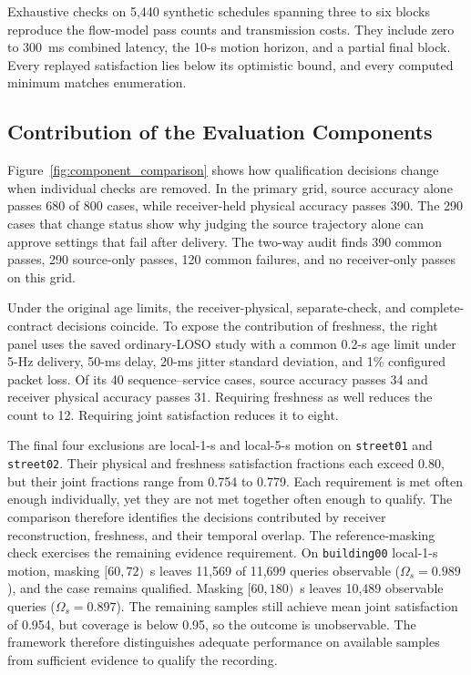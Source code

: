 \documentclass[journal]{IEEEtran}
\newcommand{\rev}[1]{#1}
\newcommand{\revision}[1]{#1}
\begin{document}
\rev{Exhaustive checks on 5,440 synthetic schedules spanning three to six
blocks reproduce the flow-model pass counts and transmission costs.
They include zero to 300~ms combined latency, the 10-s motion horizon,
and a partial final block. Every replayed satisfaction lies below its
optimistic bound, and every computed minimum matches enumeration.}

\subsection{Contribution of the Evaluation Components}
\label{subsec:component_comparison}

Figure~\ref{fig:component_comparison} shows how qualification decisions
change when individual checks are removed. In the primary grid,
source accuracy alone passes
680 of 800 cases, while receiver-held physical accuracy passes 390.
The 290 cases that change status show why judging the source trajectory
alone can approve settings that fail after delivery.
\rev{The two-way audit finds 390 common passes, 290 source-only passes,
120 common failures, and no receiver-only passes on this grid.}

Under the original age limits, the receiver-physical, separate-check, and
complete-contract decisions coincide. To expose the contribution of freshness,
the right panel uses the saved ordinary-LOSO study with a common 0.2-s age
limit under 5-Hz delivery, 50-ms delay, 20-ms jitter standard deviation,
and 1\% configured packet loss. Of its 40 sequence--service cases, source
accuracy passes 34 and receiver physical accuracy passes 31. Requiring
freshness as well reduces the count to 12. Requiring joint satisfaction
reduces it to eight.

The final four exclusions are local-1-s and local-5-s motion on
\texttt{street01} and \texttt{street02}. Their physical and freshness
satisfaction fractions each exceed 0.80, but their joint fractions range
from 0.754 to 0.779. Each requirement is met often enough individually,
yet they are not met together often enough to qualify. The comparison
therefore identifies the decisions contributed by receiver reconstruction,
freshness, and their temporal overlap.
\revision{The reference-masking check exercises the remaining evidence
requirement. On \texttt{building00} local-1-s motion, masking
$[60,72)$~s leaves 11,569 of 11,699 queries observable
($\Omega_s=0.989$), and the case remains qualified. Masking
$[60,180)$~s leaves 10,489 observable queries ($\Omega_s=0.897$).
The remaining samples still achieve mean joint satisfaction of 0.954,
but coverage is below 0.95, so the outcome is unobservable. The
framework therefore distinguishes adequate performance on available
samples from sufficient evidence to qualify the recording.}
\end{document}

